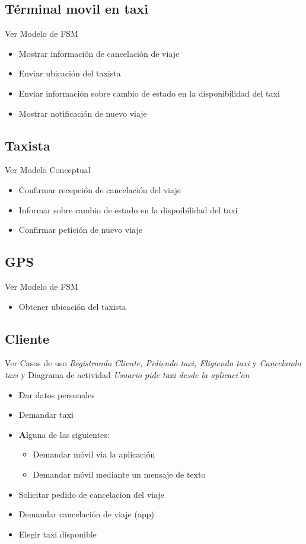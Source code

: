 \documentclass[a4paper]{article}
\begin{document}
\subsection{T\'erminal movil en taxi}
Ver Modelo de FSM
\begin{itemize}
 \item Mostrar informaci\'on de cancelaci\'on de viaje
 \item Enviar ubicaci\'on del taxista
 \item Enviar informaci\'on sobre cambio de estado en la disponibilidad del taxi
 \item Mostrar notificaci\'on de nuevo viaje

 \end{itemize}

\subsection{Taxista}
Ver Modelo Conceptual
\begin{itemize}
 \item Confirmar recepci\'on de cancelaci\'on del viaje
 \item Informar sobre cambio de estado en la dispoibilidad del taxi
 \item Confirmar petici\'on de nuevo viaje
\end{itemize}

\subsection{GPS}
Ver Modelo de FSM
\begin{itemize}
 \item Obtener ubicaci\'on del taxista
\end{itemize}


\subsection{Cliente}
Ver Casos de uso \textit{Registrando Cliente, Pidiendo taxi, Eligiendo taxi} y \textit{Cancelando taxi} y
Diagrama de actividad \textit{Usuario pide taxi desde la aplicaci'on}
\begin{itemize}
\item Dar datos personales
\item Demandar taxi
\item \textbf Alguna de las siguientes:
	\begin{itemize}
		\item Demandar m\'ovil via la aplicaci\'on
		\item Demandar m\'ovil mediante un mensaje de texto
	\end{itemize}
\item Solicitar pedido de cancelacion del viaje
\item Demandar cancelaci\'on de viaje (app)
\item Elegir taxi disponible

\end{itemize}
\end{document}
